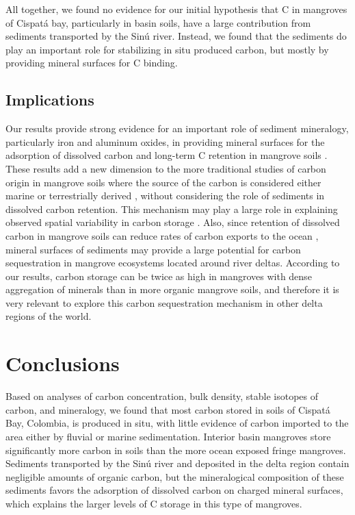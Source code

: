 All together, we found no evidence for our initial hypothesis that C in mangroves of Cispat\'a bay, particularly in basin soils, have a large contribution from sediments transported by the Sin\'u river. Instead, we found that the sediments do play an important role for stabilizing in situ produced carbon, but mostly by providing mineral surfaces for C binding. 

\subsection{Implications}
Our results provide strong evidence for an important role of sediment mineralogy, particularly iron and aluminum oxides, in providing mineral surfaces for the adsorption of dissolved carbon and long-term C retention \citep{Oades1988} in mangrove soils . These results add a new dimension to the more traditional studies of carbon origin in mangrove soils where the source of the carbon is considered either marine or terrestrially derived \citep{lacerda, Bouillion}, without considering the role of sediments in dissolved carbon retention. This mechanism may play a large role in explaining observed spatial variability in carbon storage \citep{Alongi2012, Jardine2014}. Also, since retention of dissolved carbon in mangrove soils can reduce rates of carbon exports to the ocean \citep{Adame2011}, mineral surfaces of sediments may provide a large potential for carbon sequestration in mangrove ecosystems located around river deltas. According to our results, carbon storage can be twice as high in mangroves with dense aggregation of minerals than in more organic mangrove soils, and therefore it is very relevant to explore this carbon sequestration mechanism in other delta regions of the world. 

\section{Conclusions}
Based on analyses of carbon concentration, bulk density, stable isotopes of carbon, and mineralogy, we found that most carbon stored in soils of Cispat\'a Bay, Colombia, is produced in situ, with little evidence of carbon imported to the area either by fluvial or marine sedimentation. Interior basin mangroves store significantly more carbon in soils than the more ocean exposed fringe mangroves. Sediments transported by the Sin\'u river and deposited in the delta region contain negligible amounts of organic carbon, but the mineralogical composition of these sediments favors the adsorption of dissolved carbon on charged mineral surfaces, which explains the larger levels of C storage in this type of mangroves. 

